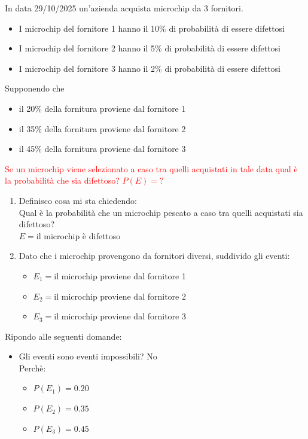 \documentclass{article}  %
\theoremstyle{definition}
\begin{document}
\begin{esercizio}[Esercizio]
	In data 29/10/2025 un'azienda acquista microchip da 3 fornitori.
	\begin{itemize}
		\item I microchip del fornitore 1 hanno il 10$\%$ di probabilità di essere difettosi
		\item I microchip del fornitore 2 hanno il 5$\%$ di probabilità di essere difettosi
		\item I microchip del fornitore 3 hanno il 2$\%$ di probabilità di essere difettosi
	\end{itemize}
	Supponendo che
	\begin{itemize}
		\item il 20$\%$ della fornitura proviene dal fornitore 1
		\item il 35$\%$ della fornitura proviene dal fornitore 2
		\item il 45$\%$ della fornitura proviene dal fornitore 3
	\end{itemize}
	\textcolor{red}{Se un microchip viene selezionato a caso tra quelli acquistati in tale data qual è la probabilità che sia difettoso? $P(E)=?$}
	\begin{enumerate}
		\item Definisco cosa mi sta chiedendo: \\
		      Qual è la probabilità che un microchip pescato a caso tra quelli acquistati sia difettoso? \\
		      $E=$il microchip è difettoso
		\item Dato che i microchip provengono da fornitori diversi, suddivido gli eventi:
		      \begin{itemize}
			      \item $E_1=$il microchip proviene dal fornitore 1
			      \item $E_2=$il microchip proviene dal fornitore 2
			      \item $E_3=$il microchip proviene dal fornitore 3
		      \end{itemize}
	\end{enumerate}
	Ripondo alle seguenti domande:
	\begin{itemize}
		\item Gli eventi sono eventi impossibili? No \\
		      Perchè:
		      \begin{itemize}
			      \item $P(E_1)=0.20$
			      \item $P(E_2)=0.35$
			      \item $P(E_3)=0.45$

\end{itemize}
\end{itemize}
\end{esercizio}
\end{document}
